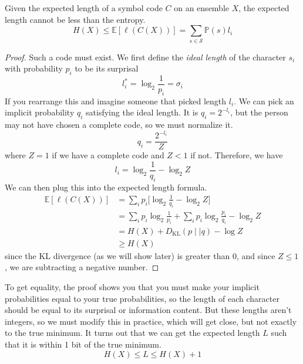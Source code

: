 \documentclass{article}
\begin{document}
    \begin{theorem}
      Given the expected length of a symbol code $C$ on an ensemble $X$, the expected length cannot be less than the entropy. 
      \begin{equation}
        H(X) \leq \mathbb{E}[\ell(C(X))] = \sum_{s \in \mathcal{S}} \mathbb{P}(s) l_i
      \end{equation}
    \end{theorem}
    \begin{proof}
      Such a code must exist. We first define the \textit{ideal length} of the character $s_i$ with probability $p_i$ to be its surprisal 
      \begin{equation}
        l_i^\ast = \log_2 \frac{1}{p_i} = \sigma_i
      \end{equation}
      If you rearrange this and imagine someone that picked length $l_i$. We can pick an implicit probability $q_i$ satisfying the ideal length.  It is $q_i = 2^{-l_i}$, but the person may not have chosen a complete code, so we must normalize it. 
      \begin{equation}
        q_i = \frac{2^{-l_i}}{Z}
      \end{equation}
      where $Z = 1$ if we have a complete code and $Z < 1$ if not. Therefore, we have 
      \begin{equation}
        l_i = \log_2 \frac{1}{q_i} - \log_2 Z 
      \end{equation}
      We can then plug this into the expected length formula. 
      \begin{align*}
        \mathbb{E}[\ell(C(X))] & = \sum_i p_i \bigg[ \log_2 \frac{1}{q_i} - \log_2 Z \bigg] \\
                               & = \sum_i p_i \log_2 \frac{1}{p_i} + \sum_i p_i \log_2 \frac{p_i}{q_i} - \log_2 Z \\
                               & = H(X) + D_{\mathrm{KL}} (p \mid \mid q) - \log Z \\
                               & \geq H(X)
      \end{align*}
      since the KL divergence (as we will show later) is greater than $0$, and since $Z \leq 1$, we are subtracting a negative number. 
    \end{proof}

    To get equality, the proof shows you that you must make your implicit probabilities equal to your true probabilities, so the length of each character should be equal to its surprisal or information content. But these lengths aren't integers, so we must modify this in practice, which will get close, but not exactly to the true minimum. It turns out that we can get the expected length $L$ such that it is within 1 bit of the true minimum. 
    \begin{equation}
      H(X) \leq L \leq H(X) + 1
    \end{equation}
\end{document}
